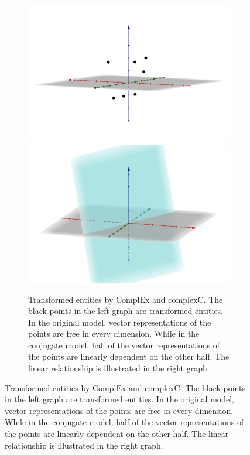 \documentclass[11pt]{article}
\begin{document}
\begin{figure}[h!]
    \centering
    \begin{subfigure}{.49\textwidth}
        \vspace{0.2cm}
        \includegraphics[scale=0.05]{figures/complex.png}
        \includegraphics[scale=0.05]{figures/complexc.png}
        \vspace{0.2cm}
        \caption{
            Transformed entities by $\mathrm{ComplEx}$ and $\mathrm{complexC}$.
            The black points in the left graph are transformed entities. 
            In the original model, vector representations of the points are free in every dimension. 
            While in the conjugate model, half of the vector representations of the points are linearly dependent on the other half. 
            The linear relationship is illustrated in the right graph.}
    \end{subfigure}\hfill

\end{figure}
\end{document}
